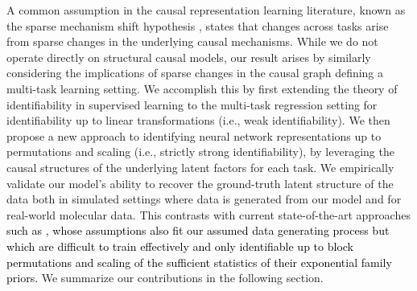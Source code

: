 \documentclass[10pt]{article} %
\theoremstyle{plain}
\theoremstyle{definition}
\begin{document}
A common assumption in the causal representation learning literature, known as the sparse mechanism shift hypothesis \citep{scholkopf2019causality,scholkopf2021toward,perry2022causal}, states that changes across tasks arise from sparse changes in the underlying causal mechanisms. While we do not operate directly on structural causal models, our result arises by similarly considering the implications of sparse changes in the causal graph defining a multi-task learning setting. We accomplish this by first
extending the theory of identifiability in supervised learning to the multi-task regression setting for identifiability up to linear transformations (i.e., weak identifiability). We then propose a new approach to identifying neural network representations up to permutations and scaling (i.e., strictly strong identifiability), by leveraging the causal structures 
of the underlying latent factors for each task. 
We empirically validate our model's ability to recover the ground-truth latent structure of the data both in simulated settings where data is generated from our model and for real-world molecular data. This contrasts with current state-of-the-art approaches \textcolor{black}{such as \citep{Khemakhem_Kingma_Monti_Hyvarinen_2020,Lu_Wu_Hernandez-Lobato_Scholkopf_2022}, whose assumptions also fit our assumed data generating process but which are difficult to train effectively and only identifiable up to block permutations and scaling of the sufficient statistics of their exponential family priors.} We summarize our contributions in the following section.
\end{document}
